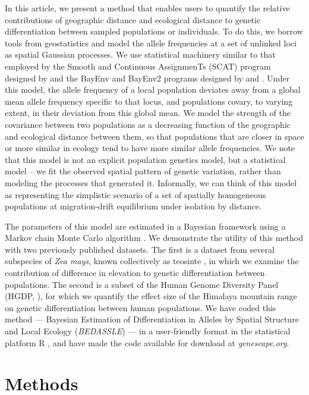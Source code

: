 In this article, we present a method that enables users to quantify the relative contributions of geographic distance and ecological distance to genetic differentiation between sampled populations or individuals.  To do this, we borrow tools from geostatistics \citep{Diggle1998} and model the allele frequencies at a set of unlinked loci as spatial Gaussian processes.   We use statistical machinery similar to that employed by the Smooth and Continuous AssignmenTs (SCAT) program designed by \citep{Wasser2004} and the BayEnv and BayEnv2 programs designed by \citep{Coop2010} and \citep{GuntherCoop2013}.  Under this model, the allele frequency of a local population deviates away from a global mean allele frequency specific to that locus, and populations covary, to varying extent, in their deviation from this global mean.  We model the strength of the covariance between two populations as a decreasing function of the geographic and ecological distance between them, so that populations that are closer in space or more similar in ecology tend to have more similar allele frequencies. 
We note that this model is not an explicit population genetics model, but a statistical model -- we fit the observed spatial pattern of genetic variation, rather than modeling the processes that generated it.
Informally, we can think of this model as representing the simplistic scenario of a set of spatially homogeneous populations 
at migration-drift equilibrium under isolation by distance.


The parameters of this model are estimated in a Bayesian framework using a Markov chain Monte Carlo algorithm \citep{Metropolis1953, Hastings1970}.  We demonstrate the utility of this method with two previously published datasets. The first is a dataset from several subspecies of \textit{Zea mays}, known collectively as teosinte \citep{Fang2012}, in which we examine the contribution of difference in elevation to genetic differentiation between populations. The second is a subset of the Human Genome Diversity Panel (HGDP, \citep{Conrad2006, Li2008}), for which we quantify the effect size of the Himalaya mountain range on genetic differentiation between human populations.  We have coded this method --- Bayesian Estimation of Differentiation in Alleles by Spatial Structure and Local Ecology (\emph{BEDASSLE}) --- in a user-friendly format in the statistical platform R \citep{R}, and have made the code available for download at \textit{genescape.org}.

\section*{Methods}

